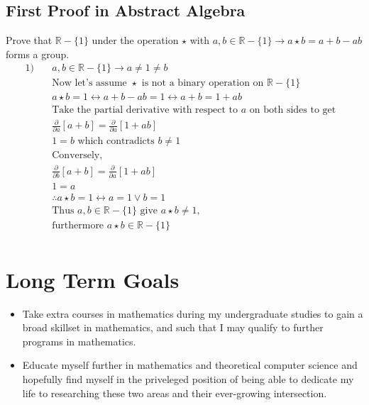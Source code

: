\documentclass{article}
\begin{document}
\subsection*{First Proof in Abstract Algebra}
Prove that \( \mathbb{R} - \{1\} \) under the operation \(\star\) 
with \(a,b \in \mathbb{R} - \{1\} \rightarrow a \star b = a+b-ab\)
forms a group.
\begin{align*} 
  1) \quad & a,b \in \mathbb{R} - \{1\} \rightarrow a \neq 1 \neq b & \\
     & \text{Now let's assume } \star \text{ is not a binary operation on } \mathbb{R} - \{1\} & \\
     & a \star b = 1 \leftrightarrow a+b-ab = 1 \leftrightarrow a+b = 1 + ab&\\
     & \text{Take the partial derivative with respect to } a \text{ on both sides to get} &\\
     & \frac{\partial}{\partial{a}} [a+b] = \frac{\partial}{\partial{a}} [1 + ab]  & \\
     & 1 = b \text{ which contradicts } b \neq 1 & \\
     & \text{Conversely, } & \\
     & \frac{\partial}{\partial{b}} [a+b] = \frac{\partial}{\partial{a}}[1+ab] & \\
     & 1 = a & \\
     & \therefore a \star b = 1 \leftrightarrow a = 1 \lor b = 1 & \\
     & \text{Thus } a,b \in \mathbb{R} - \{1\} \text{ give } a \star b \neq 1 \text{,} &\\
     & \text{furthermore } a \star b \in \mathbb{R} - \{1\}& \\
\end{align*}

\section{Long Term Goals}
\begin{itemize}
  \item Take extra courses in mathematics during my undergraduate studies to gain a broad skillset in mathematics, and such that I may qualify to further programs in mathematics. 
  \item Educate myself further in mathematics and theoretical computer science and hopefully find myself in the priveleged position of being able to dedicate my life to researching these two areas and their ever-growing intersection.
\end{itemize}
\end{document}
